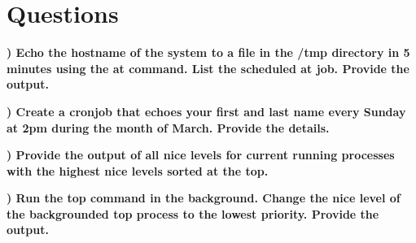 \documentclass{report}
\title{\classinfo}
\author{\semester}
\date{\today}
\newcommand{\mysection}[1]{\section*{#1}}
\newcommand{\mysubsection}[2]{\textbf{\romannumeral #1) #2}}
\begin{document}
\maketitle

\mysection{Questions}

\mysubsection{1}{Echo the hostname of the system to a file in the /tmp
directory in 5 minutes using the at command. List the scheduled at job.
Provide the
output.}



\noindent\mysubsection{2}{Create a cronjob that echoes your first and last name
every Sunday at 2pm during the month of March. Provide the
details.}



\noindent\mysubsection{3}{Provide the output of all nice levels for current
running processes with the highest nice levels sorted at the
top.}



\noindent\mysubsection{4}{Run the top command in the background. Change the nice
level of the backgrounded top process to the lowest priority. Provide
the
output.}

\end{document}
